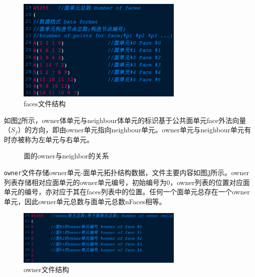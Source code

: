 \begin{figure}[htp]
	\centering
	\includegraphics[width=0.72\textwidth]{./figures/faces.png}
	\caption{faces文件结构}
	\label{fig:faces_file}	
\end{figure}

如图\ref{fig:owner_neighbor}所示，owner体单元与neighbour体单元的标识基于公共面单元face外法向量（$S_f$）的方向，即由owner单元指向neighbour单元。owner单元与neighbour单元有时亦被称为左单元与右单元。


\begin{figure}[htb]
	\centering
	 \qquad
	\caption{面的owner与neighbor的关系}
	\label{fig:owner_neighbor}
\end{figure}

\texttt{owner}文件存储owner单元-面单元拓扑结构数据，文件主要内容如图\ref{fig:owner_file}所示。owner列表存储相对应面单元的owner单元编号，初始编号为0，owner列表的位置对应面单元的编号，亦对应于其在faces列表中的位置。任何一个面单元总存在一个owner单元，因此owner单元总数与面单元总数nFaces相等。

\begin{figure}[htp]
	\centering
	\includegraphics[width=0.72\textwidth]{./figures/owner.png}
	\caption{owner文件结构}
	\label{fig:owner_file}	
\end{figure}

